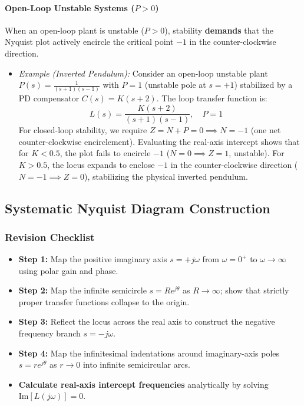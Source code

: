 \documentclass[12pt,onecolumn,twoside ]{article}
\begin{document}
	\paragraph{Open-Loop Unstable Systems ($P > 0$)}
	When an open-loop plant is unstable ($P > 0$), stability \textbf{demands} that the Nyquist plot actively encircle the critical point $-1$ in the counter-clockwise direction.
	\begin{itemize}
		\item
		\textit{Example (Inverted Pendulum):} Consider an open-loop unstable plant $P(s) = \frac{1}{(s+1)(s-1)}$ with $P = 1$ (unstable pole at $s = +1$) stabilized by a PD compensator $C(s) = K(s+2)$. The loop transfer function is: \[
		L(s) = \frac{K(s+2)}{(s+1)(s-1)}, \quad P = 1 \quad
		\] For closed-loop stability, we require $Z = N + P = 0 \implies N = -1$ (one net counter-clockwise encirclement). Evaluating the real-axis intercept shows that for $K < 0.5$, the plot fails to encircle $-1$ ($N = 0 \implies Z = 1$, unstable). For $K > 0.5$, the locus expands to enclose $-1$ in the counter-clockwise direction ($N = -1 \implies Z = 0$), stabilizing the physical inverted pendulum.
	\end{itemize}
	
	\subsection{Systematic Nyquist Diagram Construction}
	\subsubsection{Revision Checklist}
	\begin{itemize}
		\item[$\square$]
		\textbf{Step 1:} Map the positive imaginary axis $s = +j\omega$ from $\omega = 0^+$ to $\omega \to \infty$ using polar gain and phase.
		\item[$\square$]
		\textbf{Step 2:} Map the infinite semicircle $s = R e^{j\theta}$ as $R \to \infty$; show that strictly proper transfer functions collapse to the origin.
		\item[$\square$]
		\textbf{Step 3:} Reflect the locus across the real axis to construct the negative frequency branch $s = -j\omega$.
		\item[$\square$]
		\textbf{Step 4:} Map the infinitesimal indentations around imaginary-axis poles $s = r e^{j\theta}$ as $r \to 0$ into infinite semicircular arcs.
		\item[$\square$]
		\textbf{Calculate real-axis intercept frequencies} analytically by solving $\text{Im}[L(j\omega)] = 0$.
	\end{itemize}
	
\end{document}
